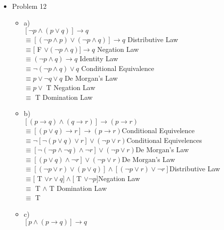 \documentclass[10pt,a4paper]{article}
\begin{document}
\begin{itemize}
\begin{itemize}
\begin{itemize}
\begin{tabular}{|c|}
      T\\
      T\\ \hline
      T\\
      T\\
      T\\
      T\\ \hline
      \end{tabular}
    \end{itemize}
    \item Problem 12
    \begin{itemize}
      \item a)\\ 
      $[\lnot p\land(p\lor q)]\to q$\\
      $\equiv[(\lnot p\land p)\lor (\lnot p\land q)]\to q$ \hfill Distributive Law\\
      $\equiv [$ F $ \lor (\lnot p\land q)]\to q$ \hfill Negation Law\\
      $\equiv (\lnot p\land q)\to q$ \hfill Identity Law\\ 
      $\equiv \lnot (\lnot p\land q)\lor q$ \hfill Conditional Equivalence\\ 
      $\equiv p\lor \lnot q\lor q$ \hfill De Morgan's Law\\ 
      $\equiv p\lor $ T \hfill Negation Law\\ 
      $\equiv$ T \hfill Domination Law 
      \item b)\\
      $[(p\to q)\land (q\to r)]\to (p\to r)$\\
      $\equiv [(p\lor q)\to r]\to (p\to r)$\hfill Conditional Equivelence\\
      $\equiv \lnot [\lnot(p\lor q)\lor r]\lor (\lnot p\lor r)$\hfill Conditional Equivelences\\
      $\equiv [\lnot (\lnot p\land \lnot q)\land \lnot r]\lor (\lnot p\lor r)$\hfill De Morgan's Law\\
      $\equiv [(p\lor q)\land \lnot r]\lor (\lnot p\lor r)$\hfill De Morgan's Law\\
      $\equiv [(\lnot p\lor r)\lor (p\lor q)]\land [(\lnot p\lor r)\lor \lnot r]$\hfill Distributive Law\\
      $\equiv [$ T $ \lor r\lor q]\land [$ T $ \lor \lnot p]$\hfill Negation Law\\
      $\equiv $ T $ \land $ T \hfill Domination Law\\
      $\equiv $ T 
      \item c)\\
      $[p\land (p\to q)]\to q$\\

\end{itemize}
\end{itemize}
\end{itemize}
\end{document}
